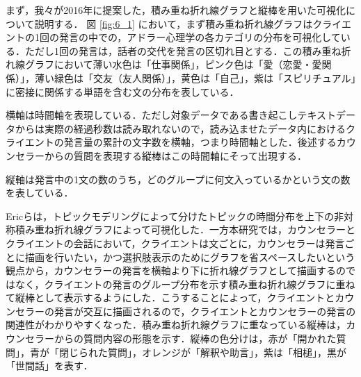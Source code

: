 \documentclass[shuuron]{kuee}
\begin{document}



まず，我々\cite{uetsuji}が2016年に提案した，積み重ね折れ線グラフと縦棒を用いた可視化について説明する．
図
\ref{fig:6_1}
において，まず積み重ね折れ線グラフはクライエントの1回の発言の中での，アドラー心理学の各カテゴリの分布を可視化している．ただし1回の発言は，話者の交代を発言の区切れ目とする．この積み重ね折れ線グラフにおいて薄い水色は「仕事関係」，ピンク色は「愛（恋愛・愛関係）」，薄い緑色は「交友（友人関係）」，黄色は「自己」，紫は「スピリチュアル」に密接に関係する単語を含む文の分布を表している．

横軸は時間軸を表現している．ただし対象データである書き起こしテキストデータからは実際の経過秒数は読み取れないので，読み込ませたデータ内におけるクライエントの発言量の累計の文字数を横軸，つまり時間軸とした．後述するカウンセラーからの質問を表現する縦棒はこの時間軸にそって出現する．

縦軸は発言中の1文の数のうち，どのグループに何文入っているかという文の数を表している．



Ericら\cite{taskdriven}は，トピックモデリングによって分けたトピックの時間分布を上下の非対称積み重ね折れ線グラフによって可視化した．一方本研究では，カウンセラーとクライエントの会話において，クライエントは文ごとに，カウンセラーは発言ごとに描画を行いたい，かつ選択肢表示のためにグラフを省スペースしたいという観点から，カウンセラーの発言を横軸より下に折れ線グラフとして描画するのではなく，クライエントの発言のグループ分布を示す積み重ね折れ線グラフに重ねて縦棒として表示するようにした．こうすることによって，クライエントとカウンセラーの発言が交互に描画されるので，クライエントとカウンセラーの発言の関連性がわかりやすくなった．積み重ね折れ線グラフに重なっている縦棒は，カウンセラーからの質問内容の形態を示す．縦棒の色分けは，赤が「開かれた質問」，青が「閉じられた質問」，オレンジが「解釈や助言」，紫は「相槌」，黒が「世間話」を表す．
\end{document}
